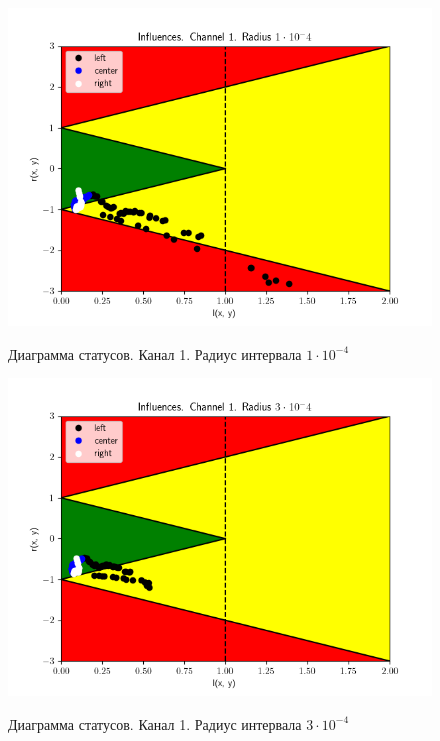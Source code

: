 \begin{figure}[H]
	\begin{center}
		\includegraphics[scale=0.83]{status_ch1_rad1}
		\label{pic:ch11}
		\caption{Диаграмма статусов. Канал 1. Радиус интервала $1 \cdot 10 ^ {-4}$}
	\end{center}
\end{figure}

\begin{figure}[H]
	\begin{center}
		\includegraphics[scale=0.83]{status_ch1_rad3}
		\label{pic:ch13}
		\caption{Диаграмма статусов. Канал 1. Радиус интервала $3 \cdot 10 ^ {-4}$}
	\end{center}
\end{figure}

